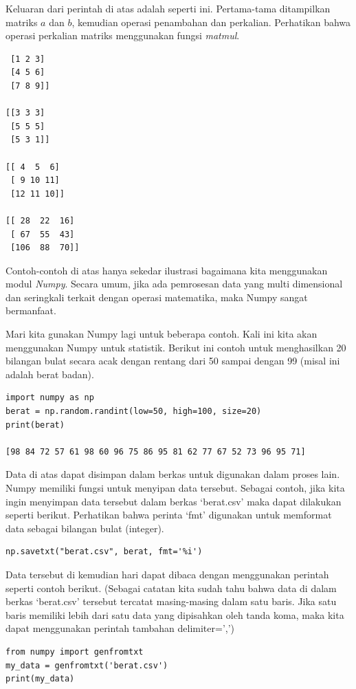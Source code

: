 Keluaran dari perintah di atas adalah seperti ini. Pertama-tama ditampilkan
matriks $a$ dan $b$, kemudian operasi penambahan dan perkalian.
Perhatikan bahwa operasi perkalian matriks menggunakan fungsi {\em matmul}.
\begin{verbatim}
 [1 2 3]
 [4 5 6]
 [7 8 9]]

[[3 3 3]
 [5 5 5]
 [5 3 1]]

[[ 4  5  6]
 [ 9 10 11]
 [12 11 10]]

[[ 28  22  16]
 [ 67  55  43]
 [106  88  70]]
\end{verbatim}

Contoh-contoh di atas hanya sekedar ilustrasi bagaimana kita menggunakan
modul {\em Numpy}. Secara umum, jika ada pemrosesan data yang multi dimensional
dan seringkali terkait dengan operasi matematika, maka Numpy
sangat bermanfaat.

Mari kita gunakan Numpy lagi untuk beberapa contoh.
Kali ini kita akan menggunakan Numpy untuk statistik.
Berikut ini contoh untuk menghasilkan 20 bilangan bulat secara acak
dengan rentang dari 50 sampai dengan 99 (misal ini adalah berat badan).

\begin{verbatim}
import numpy as np
berat = np.random.randint(low=50, high=100, size=20)
print(berat)

[98 84 72 57 61 98 60 96 75 86 95 81 62 77 67 52 73 96 95 71]
\end{verbatim}

Data di atas dapat disimpan dalam berkas untuk digunakan dalam
proses lain. Numpy memiliki fungsi untuk menyipan data tersebut.
Sebagai contoh, jika kita ingin menyimpan data tersebut dalam
berkas `berat.csv' maka dapat dilakukan seperti berikut.
Perhatikan bahwa perinta `fmt' digunakan untuk memformat data
sebagai bilangan bulat (integer).
\begin{verbatim}
np.savetxt("berat.csv", berat, fmt='%i')
\end{verbatim}

Data tersebut di kemudian hari dapat dibaca dengan menggunakan perintah
seperti contoh berikut. (Sebagai catatan kita sudah tahu bahwa data di
dalam berkas `berat.csv' tersebut tercatat masing-masing dalam satu baris.
Jika satu baris memiliki lebih dari satu data yang dipisahkan oleh tanda koma,
maka kita dapat menggunakan perintah tambahan delimiter=',')
\begin{verbatim}
from numpy import genfromtxt
my_data = genfromtxt('berat.csv')
print(my_data)
\end{verbatim}


